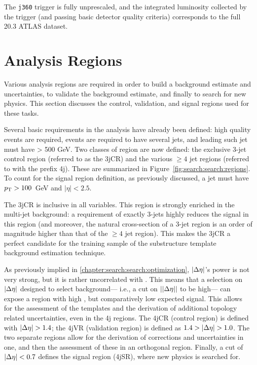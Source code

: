 The \texttt{j360} trigger is fully unprescaled, and the integrated luminosity collected by the trigger (and passing basic detector quality criteria) corresponds to the full 20.3 \ifb ATLAS dataset.

\section{Analysis Regions}
\label{chapter:search:search:regions}

Various analysis regions are required in order to build a background estimate and uncertainties, to validate the background estimate, and finally to search for new physics. This section discusses the control, validation, and signal regions used for these tasks.

Several basic requirements in the analysis have already been defined: high quality events are required, events are required to have several \largeR jets, and leading such jet must have \ptjet > 500 GeV. Two classes of region are now defined: the exclusive 3-jet control region (referred to as the 3jCR) and the various $\geq 4$ jet regions (referred to with the prefix 4j). These are summarized in Figure~\ref{fig:search:search:regions}. To count for the signal region definition, as previously discussed, a jet must have $p_{\text{T}} > 100$~GeV and $|\eta| < 2.5$. 

The 3jCR is inclusive in all variables. This region is strongly enriched in the multi-jet background: a requirement of exactly 3-jets highly reduces the signal in this region (and moreover, the natural cross-section of a 3-jet region is an order of magnitude higher than that of the $\geq 4$ jet region). This makes the 3jCR a perfect candidate for the training sample of the substructure template background estimation technique.

As previously implied in \ref{chapter:search:search:optimization}, $|\Delta\eta|$'s power is not very strong, but it is rather uncorrelated with \MJ. This means that a selection on $|\Delta\eta|$ designed to select background--- i.e., a cut on $||\Delta\eta||$ to be high--- can expose a region with high \MJ, but comparatively low expected signal. This allows for the assessment of the templates and the derivation of additional topology related uncertainties, even in the 4j regions. The 4jCR (control region) is defined with $|\Delta\eta| > 1.4$; the 4jVR (validation region) is defined as $1.4 >|\Delta\eta| > 1.0$. The two separate regions allow for the derivation of corrections and uncertainties in one, and then the assessment of these in an orthogonal region. Finally, a cut of $|\Delta\eta| < 0.7$ defines the signal region (4jSR), where new physics is searched for.

